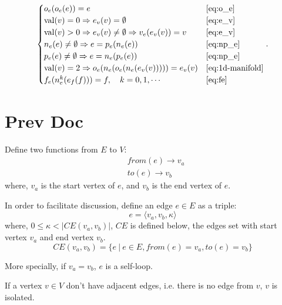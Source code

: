 \documentclass[9pt,twocolumn]{extarticle}
\DeclareMathOperator{\VAL}{val}
\begin{document}
\begin{equation}
  \begin{cases}
    o_e(o_e(e)) = e &\text{\Cref{eq:o_e}}\\
    \VAL(v) = 0 \Rightarrow e_v(v) = \emptyset &\text{\Cref{eq:e_v}}\\
    \VAL(v) > 0 \Rightarrow
    e_v(v) \neq \emptyset \Rightarrow v_e(e_v(v)) = v &\text{\Cref{eq:e_v}}\\
    n_e(e) \neq \emptyset \Rightarrow e = p_e(n_e(e)) &\text{\Cref{eq:np_e}}\\
    p_e(e) \neq \emptyset \Rightarrow e = n_e(p_e(e)) &\text{\Cref{eq:np_e}}\\
    \VAL(v)=2 \Rightarrow o_e(n_e(o_e(n_e(e_v(v))))) = e_v(v) &\text{\Cref{eq:1d-manifold}}\\
    f_e(n_e^k(e_f(f))) = f, \quad k=0, 1, \cdots &\text{\Cref{eq:fe}}
  \end{cases}.
\end{equation}

\section{Prev Doc}

Define two functions from $E$ to $V$:
\begin{align}
&from(e) \rightarrow v_a\\
&to(e) \rightarrow v_b
\end{align}
where, $v_a$ is the start vertex of $e$, and $v_b$ is the end vertex of $e$.

In order to facilitate discussion, define an edge $e\in E$ as a triple:
\begin{equation}
e=\langle v_a, v_b, \kappa \rangle
\end{equation}
where, $0\leq \kappa <|CE(v_a,v_b)|$, $CE$ is defined below, the edges set with 
start vertex $v_a$ and end vertex $v_b$.
\begin{equation}
CE(v_a,v_b)=\{e \ |\ e\in E, from(e)=v_a,to(e)=v_b\}
\end{equation}

More specially, if $v_a=v_b$, $e$ is a self-loop.

If a vertex $v\in V$ don't have adjacent edges, i.e. there is no edge from $v$, $v$ is isolated.
\end{document}
